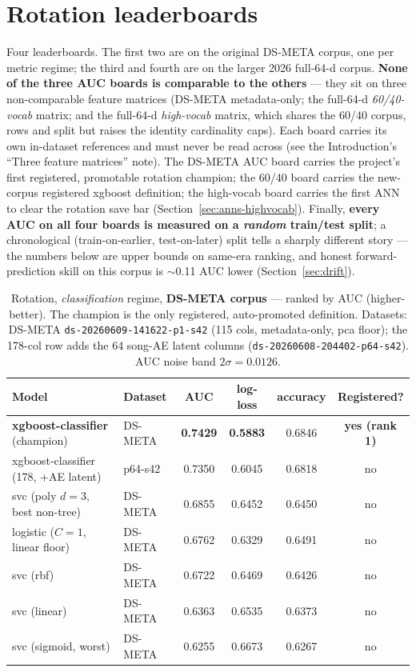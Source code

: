 \documentclass[11pt]{article}
\newcommand{\dsid}[1]{\texttt{\small #1}}
\newcommand{\best}[1]{\textbf{#1}}
\begin{document}
\section{Rotation leaderboards}
\label{sec:leaderboard}
Four leaderboards. The first two are on the original DS-META corpus, one per
metric regime; the third and fourth are on the larger 2026 full-64-d corpus.
\textbf{None of the three AUC boards is comparable to the others} --- they sit
on three non-comparable feature matrices (DS-META metadata-only; the full-64-d
\emph{60/40-vocab} matrix; and the full-64-d \emph{high-vocab} matrix, which
shares the 60/40 corpus, rows and split but raises the identity cardinality
caps). Each board carries its own in-dataset references and must never be read
across (see the Introduction's ``Three feature matrices'' note). The DS-META
AUC board carries the project's first registered, promotable rotation champion;
the 60/40 board carries the new-corpus registered xgboost definition; the
high-vocab board carries the first ANN to clear the rotation save bar
(Section~\ref{sec:anns-highvocab}). Finally, \textbf{every AUC on all four
boards is measured on a \emph{random} train/test split}; a chronological
(train-on-earlier, test-on-later) split tells a sharply different story --- the
numbers below are upper bounds on same-era ranking, and honest
forward-prediction skill on this corpus is $\sim$0.11 AUC lower
(Section~\ref{sec:drift}).

\begin{table}[ht]
  \centering
  \caption{Rotation, \emph{classification} regime, \textbf{DS-META corpus} ---
  ranked by AUC (higher-better). The champion is the only registered,
  auto-promoted definition. Datasets: DS-META
  \dsid{ds-20260609-141622-p1-s42} (115 cols, metadata-only, pca floor); the
  178-col row adds the 64 song-AE latent columns
  (\dsid{ds-20260608-204402-p64-s42}). AUC noise band $2\sigma=0.0126$.}
  \label{tab:lb-auc}
  \begin{tabular}{llcccc}
    \toprule
    Model & Dataset & AUC & log-loss & accuracy & Registered? \\
    \midrule
    \best{xgboost-classifier} (champion) & DS-META & \best{0.7429} & \best{0.5883} & 0.6846 & \best{yes (rank 1)} \\
    xgboost-classifier (178, +AE latent) & p64-s42 & 0.7350 & 0.6045 & 0.6818 & no \\
    svc (poly $d{=}3$, best non-tree)    & DS-META & 0.6855 & 0.6452 & 0.6450 & no \\
    logistic ($C{=}1$, linear floor)     & DS-META & 0.6762 & 0.6329 & 0.6491 & no \\
    svc (rbf)                            & DS-META & 0.6722 & 0.6469 & 0.6426 & no \\
    svc (linear)                         & DS-META & 0.6363 & 0.6535 & 0.6373 & no \\
    svc (sigmoid, worst)                 & DS-META & 0.6255 & 0.6673 & 0.6267 & no \\
    \bottomrule
  \end{tabular}
\end{table}
\end{document}
